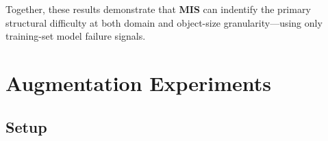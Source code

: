 \documentclass[conference]{IEEEtran}
\begin{document}
Together, these results demonstrate that \textbf{MIS} can 
indentify the primary structural difficulty at both
domain and object-size granularity---using only training-set
model failure signals.

\begin{table}[t]
\centering
\caption{Correlation of mean $S_{\mathrm{img}}$ and Average Precision across GWHD domains}
\label{tab:domain}
\end{table}

\begin{table}[t]
\centering
\caption{Correlation of Object Difficulty Score $S_{\mathrm{obj}}$ with object size on MinneApple.
\label{tab:size_score}}
\end{table}



\section{Augmentation Experiments}

\subsection{Setup}
\end{document}
